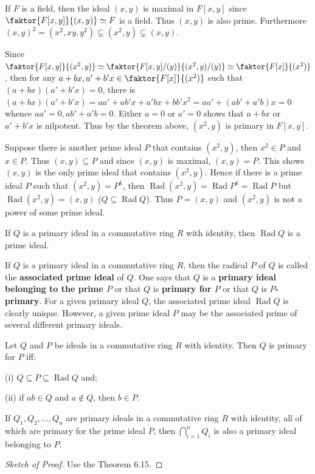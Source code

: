 \documentclass{article}
\DeclareMathOperator{\Rad}{Rad}
\newenvironment{sketch}[1][Sketch of Proof]{\begin{proof}[#1]}{\end{proof}}
\begin{document}
\begin{example}
    If $F$ is a field, then the ideal $(x,y)$ is maximal in $F[x,y]$ since $\faktor{F[x,y]}{(x,y)} \simeq F$ is a field. Thus $(x,y)$ is also prime. Furthermore $(x,y)^2=(x^2,xy,y^2)\subsetneq (x^2,y) \subsetneq (x,y)$. 
    
    Since $\faktor{F[x,y]}{(x^2,y)} \simeq \faktor{F[x,y]/(y)}{(x^2,y)/(y)} \simeq \faktor{F[x]}{(x^2)}$, then for any $a+bx, a'+b'x \in \faktor{F[x]}{(x^2)}$ such that $(a+bx)(a'+b'x)=0$, there is $(a+bx)(a'+b'x)=aa'+ab'x+a'bx+bb'x^2=aa'+(ab'+a'b)x=0$ whence $aa'=0,ab'+a'b=0$. Either $a=0$ or $a'=0$ shows that $a+bx$ or $a'+b'x$ is nilpotent. Thus by the theorem above, $(x^2,y)$ is primary in $F[x,y]$. 

    Suppose there is another prime ideal $P$ that contains $(x^2,y)$, then $x^2 \in P$ and $x \in P$. Thus $(x,y) \subseteq P$ and since $(x,y)$ is maximal, $(x,y)=P$. This shows $(x,y)$ is the only prime ideal that contains $(x^2,y)$. Hence if there is a prime ideal $P$ such that $(x^2,y)=P^k$, then $\Rad (x^2,y)=\Rad P^k=\Rad P$ but $\Rad (x^2,y)=(x,y)$ ($Q \subseteq \Rad Q$). Thus $P=(x,y)$ and $(x^2,y)$ is not a power of some prime ideal.
\end{example}

\begin{theorem}
    If $Q$ is a primary ideal in a commutative ring $R$ with identity, then $\Rad Q$ is a prime ideal.
\end{theorem}
\begin{remark}
    If $Q$ is a primary ideal in a commutative ring $R$, then the radical $P$ of $Q$ is called the \textbf{associated prime ideal} of $Q$. One says that $Q$ is a \textbf{primary ideal belonging to the prime $P$} or that $Q$ is \textbf{primary for $P$} or that $Q$ is \textbf{$P$-primary}. For a given primary ideal $Q$, the associated prime ideal $\operatorname{Rad} Q$ is clearly unique. However, a given prime ideal $P$ may be the associated prime of several different primary ideals.
\end{remark}

\begin{theorem}
    Let $Q$ and $P$ be ideals in a commutative ring $R$ with identity. Then $Q$ is primary for $P$ iff:

    (i) $Q \subseteq P \subseteq \Rad Q$ and;

    (ii) if $ab \in Q$ and $a \notin Q$, then $b \in P$.
\end{theorem}

\begin{theorem}
    If $Q_1, Q_2, \ldots, Q_n$ are primary ideals in a commutative ring $R$ with identity, all of which are primary for the prime ideal $P$, then $\bigcap_{i=1} ^n Q_i$ is also a primary ideal belonging to $P$.
\end{theorem}
\begin{sketch}
    Use the Theorem 6.15.
\end{sketch}
\end{document}
